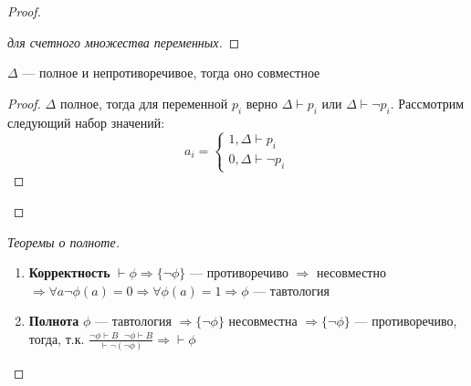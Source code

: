 \begin{proof}
\begin{enumerate}
\begin{proof}[для счетного множества переменных]
        \end{proof}
        \begin{lemma}
            $\Delta$ --- полное и непротиворечивое, тогда оно совместное
        \end{lemma}
        \begin{proof}
            $\Delta$ полное, тогда для переменной $p_i$ верно $\Delta\vdash p_i$ или $\Delta\vdash \neg p_i$. Рассмотрим следующий набор значений:
            $$a_i = \left\{\begin{array}{l}
                1, \Delta \vdash p_i  \\
                0, \Delta \vdash\neg p_i
            \end{array}\right.$$
        \end{proof}
    \end{enumerate}
\end{proof}

\begin{proof}[Теоремы о полноте]\indent
    \begin{enumerate}
        \item[] \textbf{Корректность} $\vdash \phi \Rightarrow \{\neg \phi\}$ --- противоречиво $\Rightarrow$ несовместно $\Rightarrow \forall a \neg \phi(a) = 0 \Rightarrow \forall \phi(a) = 1 \Rightarrow \phi$ --- тавтология
        \item[] \textbf{Полнота} $\phi$ --- тавтология $\Rightarrow \{\neg \phi\}$ несовместна $\Rightarrow \{\neg \phi\}$ --- противоречиво, тогда, т.к. $\frac{\neg \phi \vdash B\ \ \ \neg \phi \vdash B}{\vdash \neg(\neg\phi)} \Rightarrow \vdash\phi$
    \end{enumerate}    
\end{proof}